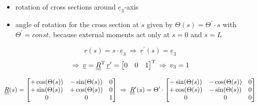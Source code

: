 \begin{frame}
\begin{multicols}{2}
    \begin{itemize}
      \item rotation of cross sections around $\underline{e}_3$-axis
      \item angle of rotation for the cross section at $s$ given by $\Theta(s) = \Theta^{\prime} \cdot s$ \newline
        with $\Theta^{\prime} = const.$ because external moments act only at $s=0$ and $s=L$
    \end{itemize}
    \vspace{0.1em}
    \begin{displaymath}
      \underline{r}(s) = s \cdot \underline{e}_3 
      \: \Rightarrow \:
      \underline{r}^{\prime}(s) = \underline{e}_3
    \end{displaymath}
    \begin{displaymath}
      \: \Rightarrow \:
      \underline{v} = \underline{\underline{R}}^{\mathrm{T}} \, \underline{r}^{\prime} =
      \begin{bmatrix}
        0 & 0 & 1
      \end{bmatrix}^{\mathrm{T}}
      \: \Rightarrow \:
      v_3 = 1
    \end{displaymath}
  \end{multicols}
  \vspace{-1.2em}
  \begin{displaymath}
    \underline{\underline{R}}(s) =
    \begin{bmatrix}
      +\cos(\Theta(s)) & -\sin(\Theta(s)) & 0 \\
      +\sin(\Theta(s)) & +\cos(\Theta(s)) & 0 \\
      0 & 0 & 1
    \end{bmatrix}
    \: \Rightarrow \:
    \underline{\underline{R}}^{\prime}(s) =
    \Theta^{\prime} \cdot
    \begin{bmatrix}
      -\sin(\Theta(s)) & -\cos(\Theta(s)) & 0 \\
      +\cos(\Theta(s)) & -\sin(\Theta(s)) & 0 \\
      0 & 0 & 0
    \end{bmatrix}
  \end{displaymath}
    

\end{frame}
